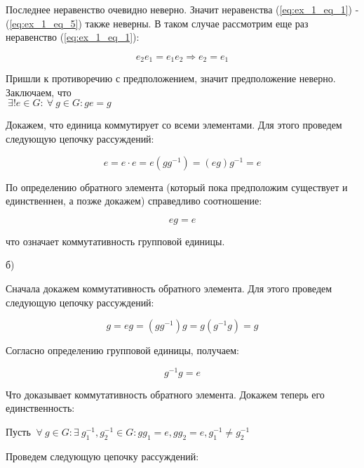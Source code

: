 \documentclass[10pt,a4paper]{article}
\begin{document}
	Последнее неравенство очевидно неверно. Значит неравенства 	
	(\ref{eq:ex_1_eq_1}) - (\ref{eq:ex_1_eq_5}) также неверны. В таком случае
	рассмотрим еще раз неравенство (\ref{eq:ex_1_eq_1}):
	
	\begin{equation}
		\label{eq:ex_1_eq_7}
		e_{2}e_{1} = e_{1}e_{2} \Rightarrow e_{2} = e_{1}
	\end{equation}
	
	Пришли к противоречию с предположением, значит предположение неверно. 
	Заключаем, что \\$\ \exists ! e \in G: \ \forall \ g \in G: ge = g$
	
	Докажем, что единица коммутирует со всеми элементами. Для этого проведем 
	следующую цепочку рассуждений:
	
	\begin{equation}
		\label{eq:ex_1_eq_8}
		e = e\cdot e = e \left(gg^{-1}\right) = \left(eg\right)g^{-1} = e
	\end{equation}
	
	По определению обратного элемента (который пока предположим существует и 
	единственнен, а позже докажем) справедливо соотношение:
	
	\begin{equation}
		\label{eq:ex_1_eq_9}
		eg = e
	\end{equation}
	
	что означает коммутативность групповой единицы.
	
	\newpage
	б)
	
	Сначала докажем коммутативность обратного элемента. Для этого проведем 
	следующую цепочку рассуждений:
	
	\begin{equation}
		\label{eq:ex_1_eq_10}
		g = eg = \left(gg^{-1}\right)g = g\left(g^{-1}g\right) = g
	\end{equation}
	
	Согласно определению групповой единицы, получаем: 
	
	\begin{equation}
		\label{eq:ex_1_eq_11}
		g^{-1}g = e
	\end{equation}
	
	Что доказывает коммутативность обратного элемента. Докажем теперь его 
	единственность:
	
	Пусть $\ \forall \ g \in G: \exists \ g_{1}^{-1}, g_{2}^{-1} \in G: 
	gg_{1}= e, gg_{2} = e, g_{1}^{-1} \neq g_{2}^{-1}$
	
	Проведем следующую цепочку рассуждений:
	
\end{document}
